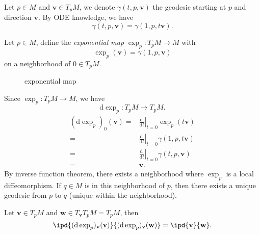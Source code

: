 Let $p\in M$ and $\mathbf{v}\in T_pM$, we denote $\gamma(t,p,\mathbf{v})$ the geodesic starting at $p$ and direction $\mathbf{v}$. By ODE knowledge, we have
\[
  \gamma(t,p,\mathbf{v})=\gamma(1,p,t\mathbf{v}).
\] 
\begin{definition}
  Let $p\in M$, define the \textit{exponential map} $\exp_p:T_pM\to M$ with 
  \[
    \exp_p(\mathbf{v})=\gamma(1,p,\mathbf{v})
  \] 
  on a neighborhood of $0\in T_pM$.
\end{definition}
\begin{figure}[ht]
    \centering
    \caption{exponential map}
    \label{fig:exponential-map}
\end{figure}
Since $\exp_p:T_pM\to M$, we have 
\[
\mathrm{d}\exp_p:T_pM\to T_pM.
\] 
\begin{align*}
  \left( \mathrm{d}\exp_p \right)_0(\mathbf{v})=&\left. \frac{\mathrm{d}~}{\mathrm{d}t}\right|_{t=0}\exp_p(t\mathbf{v})\\
    =& \left.\frac{\mathrm{d}~}{\mathrm{d}t}\right|_{t=0}\gamma(1,p,t\mathbf{v})\\
      =& \left.\frac{\mathrm{d}~}{\mathrm{d}t}\right|_{t=0}\gamma(t,p,\mathbf{v})\\
	=& \mathbf{v}
.\end{align*}
By inverse function theorem, there exists a neighborhood where $\exp_p$ is a local  diffeomorphism. If $q\in M$ is in this neighborhood of $p$, then there exists a unique geodesic from $p$ to $q$ (unique within the neighborhood).
\begin{theorem}
  Let $\mathbf{v}\in T_pM$ and $\mathbf{w}\in T_{\mathbf{v}}T_pM=T_pM$, then 
  \begin{equation}
    \ipd{(\mathrm{d}\exp_p)_{\mathbf{v}}(\mathbf{v})}{(\mathrm{d}\exp_p)_{\mathbf{v}}(\mathbf{w})}=\ipd{\mathbf{v}}{\mathbf{w}}.
  \end{equation}
\end{theorem}
